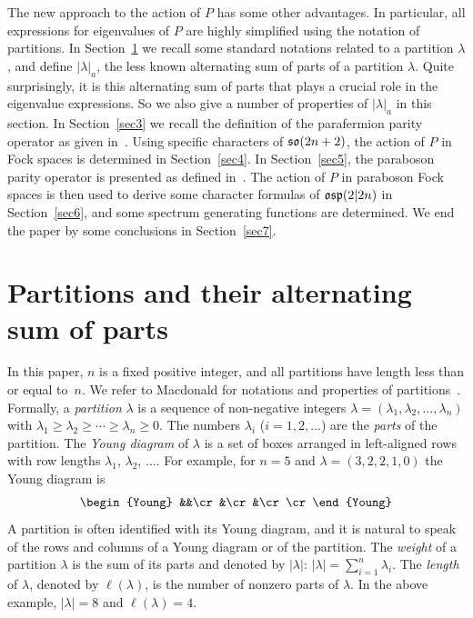 \documentclass{SciPost}
\begin{document}
The new approach to the action of $P$ has some other advantages.
In particular, all expressions for eigenvalues of $P$ are highly simplified using the notation of partitions. 
In Section~\ref{sec2} we recall some standard notations related to a partition $\lambda$, and define $|\lambda|_a$, the less known alternating sum of parts of a partition $\lambda$.
Quite surprisingly, it is this alternating sum of parts that plays a crucial role in the eigenvalue expressions.
So we also give a number of properties of $|\lambda|_a$ in this section.
In Section~\ref{sec3} we recall the definition of the parafermion parity operator as given in~\cite{SV2026}. 
Using specific characters of $\mathfrak{so}(2n+2)$, the action of $P$ in Fock spaces is determined in Section~\ref{sec4}.
In Section~\ref{sec5}, the paraboson parity operator is presented as defined in~\cite{SV2026}.
The action of $P$ in paraboson Fock spaces is then used to derive some character formulas of $\mathfrak{osp}(2|2n)$ in Section~\ref{sec6}, and some spectrum generating functions are determined.
We end the paper by some conclusions in Section~\ref{sec7}.

\setcounter{equation}{0}
\section{Partitions and their alternating sum of parts}
\label{sec2}

In this paper, $n$ is a fixed positive integer, and all partitions have length less than or equal to~$n$.
We refer to Macdonald for notations and properties of partitions~\cite{Macdonald}.
Formally, a {\em partition} $\lambda$ is a sequence of non-negative integers $\lambda=(\lambda_1,\lambda_2,\ldots,\lambda_n)$ with $\lambda_1\geq \lambda_2\geq \cdots \geq\lambda_n\geq 0$.
The numbers $\lambda_i$ ($i=1,2,\ldots$) are the {\em parts} of the partition.
The {\em Young diagram} of $\lambda$ is a set of boxes arranged in left-aligned rows with row lengths $\lambda_1$, $\lambda_2$, $\ldots$.
For example, for $n=5$ and $\lambda=(3,2,2,1,0)$ the Young diagram is
\begin{equation}
\begin{Young}
&&\cr
&\cr
&\cr
\cr
\end{Young}
\end{equation}
A partition is often identified with its Young diagram, and it is natural to speak of the rows and columns of a Young diagram or of the partition.
The {\em weight} of a partition $\lambda$ is the sum of its parts and denoted by $|\lambda|$: $|\lambda|=\sum_{i=1}^n \lambda_i$.
The {\em length} of $\lambda$, denoted by $\ell(\lambda)$, is the number of nonzero parts of $\lambda$.
In the above example, $|\lambda|=8$ and $\ell(\lambda)=4$.
\end{document}
